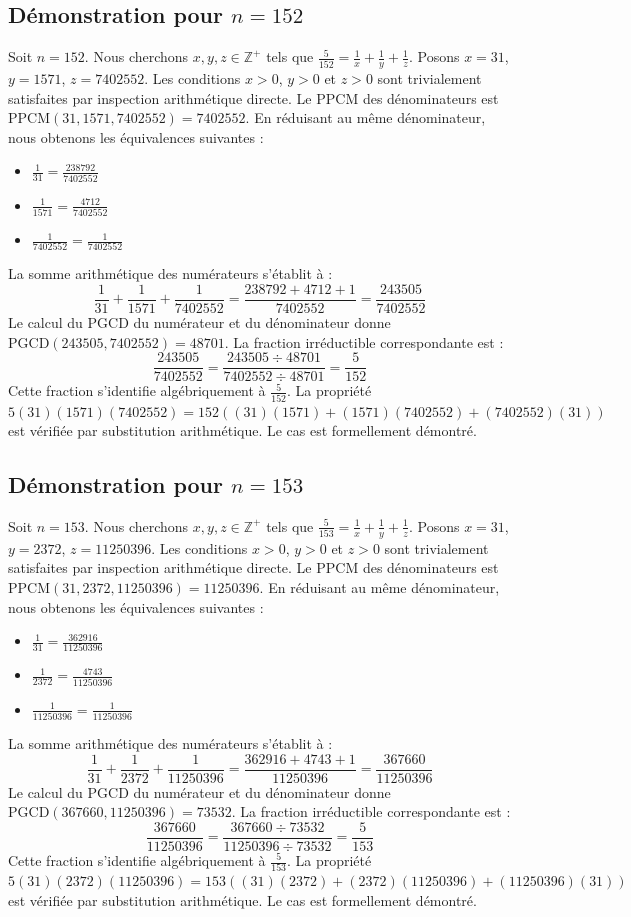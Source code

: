\documentclass[12pt,a4paper]{article}
\begin{document}
\subsection{Démonstration pour $n = 152$}
Soit $n = 152$. Nous cherchons $x, y, z \in \mathbb{Z}^{+}$ tels que $\frac{5}{152} = \frac{1}{x} + \frac{1}{y} + \frac{1}{z}$.
Posons $x = 31$, $y = 1571$, $z = 7402552$.
Les conditions $x > 0$, $y > 0$ et $z > 0$ sont trivialement satisfaites par inspection arithmétique directe.
Le PPCM des dénominateurs est $\text{PPCM}(31, 1571, 7402552) = 7402552$.
En réduisant au même dénominateur, nous obtenons les équivalences suivantes :
\begin{itemize}
    \item $\frac{1}{31} = \frac{238792}{7402552}$
    \item $\frac{1}{1571} = \frac{4712}{7402552}$
    \item $\frac{1}{7402552} = \frac{1}{7402552}$
\end{itemize}
La somme arithmétique des numérateurs s'établit à :
$$ \frac{1}{31} + \frac{1}{1571} + \frac{1}{7402552} = \frac{238792 + 4712 + 1}{7402552} = \frac{243505}{7402552} $$
Le calcul du PGCD du numérateur et du dénominateur donne $\text{PGCD}(243505, 7402552) = 48701$.
La fraction irréductible correspondante est :
$$ \frac{243505}{7402552} = \frac{243505 \div 48701}{7402552 \div 48701} = \frac{5}{152} $$
Cette fraction s'identifie algébriquement à $\frac{5}{152}$.
La propriété $5(31)(1571)(7402552) = 152((31)(1571) + (1571)(7402552) + (7402552)(31))$ est vérifiée par substitution arithmétique.
Le cas est formellement démontré.

\subsection{Démonstration pour $n = 153$}
Soit $n = 153$. Nous cherchons $x, y, z \in \mathbb{Z}^{+}$ tels que $\frac{5}{153} = \frac{1}{x} + \frac{1}{y} + \frac{1}{z}$.
Posons $x = 31$, $y = 2372$, $z = 11250396$.
Les conditions $x > 0$, $y > 0$ et $z > 0$ sont trivialement satisfaites par inspection arithmétique directe.
Le PPCM des dénominateurs est $\text{PPCM}(31, 2372, 11250396) = 11250396$.
En réduisant au même dénominateur, nous obtenons les équivalences suivantes :
\begin{itemize}
    \item $\frac{1}{31} = \frac{362916}{11250396}$
    \item $\frac{1}{2372} = \frac{4743}{11250396}$
    \item $\frac{1}{11250396} = \frac{1}{11250396}$
\end{itemize}
La somme arithmétique des numérateurs s'établit à :
$$ \frac{1}{31} + \frac{1}{2372} + \frac{1}{11250396} = \frac{362916 + 4743 + 1}{11250396} = \frac{367660}{11250396} $$
Le calcul du PGCD du numérateur et du dénominateur donne $\text{PGCD}(367660, 11250396) = 73532$.
La fraction irréductible correspondante est :
$$ \frac{367660}{11250396} = \frac{367660 \div 73532}{11250396 \div 73532} = \frac{5}{153} $$
Cette fraction s'identifie algébriquement à $\frac{5}{153}$.
La propriété $5(31)(2372)(11250396) = 153((31)(2372) + (2372)(11250396) + (11250396)(31))$ est vérifiée par substitution arithmétique.
Le cas est formellement démontré.
\end{document}
